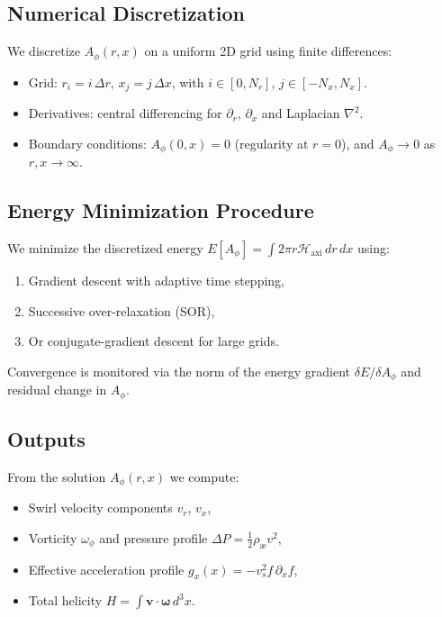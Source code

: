 \documentclass[preprint,notitlepage]{revtex4-2}
\begin{document}
        \subsection*{Numerical Discretization}
        We discretize $A_\phi(r,x)$ on a uniform 2D grid using finite differences:
        \begin{itemize}
          \item Grid: $r_i = i\,\Delta r$, $x_j = j\,\Delta x$, with $i \in [0, N_r]$, $j \in [-N_x, N_x]$.
          \item Derivatives: central differencing for $\partial_r$, $\partial_x$ and Laplacian $\nabla^2$.
          \item Boundary conditions: $A_\phi(0,x)=0$ (regularity at $r=0$), and $A_\phi \to 0$ as $r,x \to \infty$.
        \end{itemize}

        \subsection*{Energy Minimization Procedure}
        We minimize the discretized energy $E[A_\phi] = \int 2\pi r \mathcal{H}_{\text{axi}}\, dr\,dx$ using:
        \begin{enumerate}
          \item Gradient descent with adaptive time stepping,
          \item Successive over-relaxation (SOR),
          \item Or conjugate-gradient descent for large grids.
        \end{enumerate}

        Convergence is monitored via the norm of the energy gradient $\delta E / \delta A_\phi$ and residual change in $A_\phi$.

        \subsection*{Outputs}
        From the solution $A_\phi(r,x)$ we compute:
        \begin{itemize}
          \item Swirl velocity components $v_r$, $v_x$,
          \item Vorticity $\omega_\phi$ and pressure profile $\Delta P = \tfrac12 \rho_{\text{\ae}} v^2$,
          \item Effective acceleration profile $g_x(x) = -v_s^2 f\, \partial_x f$,
          \item Total helicity $H = \int \mathbf{v} \cdot \boldsymbol{\omega}\, d^3x$.
        \end{itemize}
\end{document}
